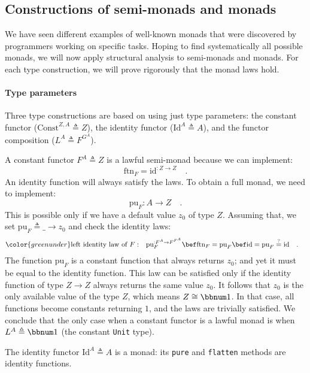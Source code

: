 \subsection{Constructions of semi-monads and monads\label{subsec:Structural-analysis-of-monads}}

We have seen different examples of well-known monads that were discovered
by programmers working on specific tasks. Hoping to find systematically
all possible monads, we will now apply structural analysis to semi-monads
and monads. For each type construction, we will prove rigorously that
the monad laws hold.

\paragraph{Type parameters}

Three type constructions are based on using just type parameters:
the constant functor ($\text{Const}^{Z,A}\triangleq Z$), the identity
functor ($\text{Id}^{A}\triangleq A$), and the functor composition
($L^{A}\triangleq F^{G^{A}}$).

A constant functor $F^{A}\triangleq Z$ is a lawful semi-monad because
we can implement:
\[
\text{ftn}_{F}=\text{id}^{:Z\rightarrow Z}\quad.
\]
An identity function will always satisfy the laws. To obtain a full
monad, we need to implement:
\[
\text{pu}_{F}:A\rightarrow Z\quad.
\]
This is possible only if we have a default value $z_{0}$ of type
$Z$. Assuming that, we set $\text{pu}_{F}\triangleq\_\rightarrow z_{0}$
and check the identity laws:
\begin{align*}
{\color{greenunder}\text{left identity law of }F:}\quad & \text{pu}_{F}^{:F^{A}\rightarrow F^{F^{A}}}\bef\text{ftn}_{F}=\text{pu}_{F}\bef\text{id}=\text{pu}_{F}\overset{?}{=}\text{id}\quad.
\end{align*}
The function $\text{pu}_{F}$ is a constant function that always returns
$z_{0}$; and yet it must be equal to the identity function. This
law can be satisfied only if the identity function of type $Z\rightarrow Z$
always returns the same value $z_{0}$. It follows that $z_{0}$ is
the only available value of the type $Z$, which means $Z\cong\bbnum 1$.
In that case, all functions become constants returning $1$, and the
laws are trivially satisfied. We conclude that the only case when
a constant functor is a lawful monad is when $L^{A}\triangleq\bbnum 1$
(the constant \lstinline!Unit! type).

The identity functor $\text{Id}^{A}\triangleq A$ is a monad: its
\lstinline!pure! and \lstinline!flatten! methods are identity functions.


